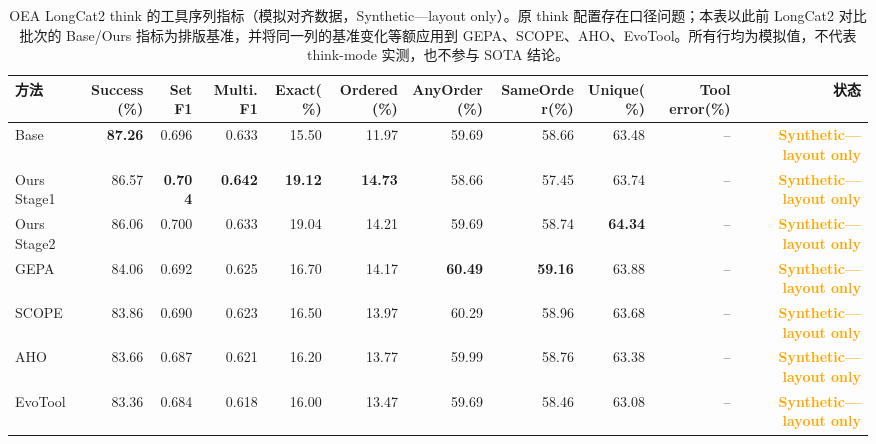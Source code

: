 \documentclass[a4paper,11pt]{article}
\newcommand{\layoutonly}{\textcolor{orange}{\textbf{Synthetic---layout only}}}
\begin{document}
\begin{CJK*}{UTF8}{gbsn}
\begin{table}[H]
\centering\scriptsize
\caption{OEA LongCat2 think 的工具序列指标（模拟对齐数据，Synthetic---layout only）。原 think 配置存在口径问题；本表以此前 LongCat2 对比批次的 Base/Ours 指标为排版基准，并将同一列的基准变化等额应用到 GEPA、SCOPE、AHO、EvoTool。所有行均为模拟值，不代表 think-mode 实测，也不参与 SOTA 结论。}
\begin{adjustbox}{max width=\textwidth}
\begin{tabular}{lrrrrrrrrrr}
\toprule
方法 & Success(\%) & Set F1 & Multi. F1 & Exact(\%) & Ordered(\%) & AnyOrder(\%) & SameOrder(\%) & Unique(\%) & Tool error(\%) & 状态\\
\midrule
Base & \textbf{87.26} & 0.696 & 0.633 & 15.50 & 11.97 & 59.69 & 58.66 & 63.48 & -- & \layoutonly\\
Ours Stage1 & 86.57 & \textbf{0.704} & \textbf{0.642} & \textbf{19.12} & \textbf{14.73} & 58.66 & 57.45 & 63.74 & -- & \layoutonly\\
Ours Stage2 & 86.06 & 0.700 & 0.633 & 19.04 & 14.21 & 59.69 & 58.74 & \textbf{64.34} & -- & \layoutonly\\
GEPA & 84.06 & 0.692 & 0.625 & 16.70 & 14.17 & \textbf{60.49} & \textbf{59.16} & 63.88 & -- & \layoutonly\\
SCOPE & 83.86 & 0.690 & 0.623 & 16.50 & 13.97 & 60.29 & 58.96 & 63.68 & -- & \layoutonly\\
AHO & 83.66 & 0.687 & 0.621 & 16.20 & 13.77 & 59.99 & 58.76 & 63.38 & -- & \layoutonly\\
EvoTool & 83.36 & 0.684 & 0.618 & 16.00 & 13.47 & 59.69 & 58.46 & 63.08 & -- & \layoutonly\\
\bottomrule
\end{tabular}
\end{adjustbox}
\end{table}


\end{CJK*}
\end{document}
